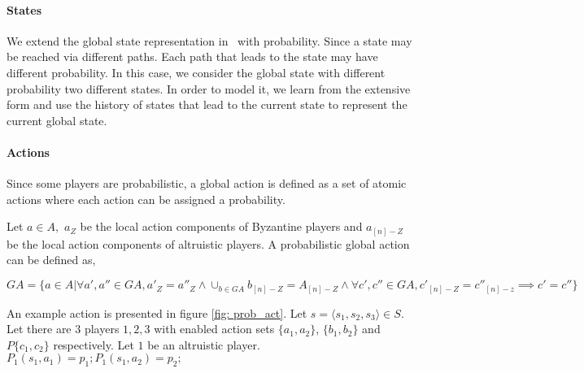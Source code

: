 %
%
%
\paragraph{States}
We extend the global state representation in~\cite{MMS08} with probability. Since a state may be reached via different paths. Each path that leads to the state may have different probability. In this case, we consider the global state with different probability two different states. In order to model it, we learn from the extensive form and use the history of states that lead to the current state to represent the current global state. 


\paragraph{Actions}
Since some players are probabilistic, a global action is defined as a set of atomic actions where each action can be assigned a probability. 

Let $a \in A,$ $a_Z$ be the local action components of Byzantine players and $a_{[n]-Z}$ be the local action components of altruistic players. A probabilistic global action can be defined as, \newline

$ GA=\{ a \in A | \forall a',a'' \in GA, a'_Z = a''_Z  \wedge \cup_{b \in GA} b_{[n]-Z}=A_{[n]-Z} \wedge  \forall c',c'' \in GA, c'_{[n]-Z} = c''_{[n]-z} \implies c'=c'' \}$
  
 
 An example action is presented in figure \ref{fig: prob_act}. Let $s= \langle s_1,s_2,s_3 \rangle \in S$. Let there are $3$ players $1,2,3$ with enabled action sets $\{a_1,a_2\}$, $\{b_1,b_2\}$ and $P\{c_1,c_2\}$ respectively. Let $1$ be an altruistic player. \\
 $P_1(s_1,a_1)=p_1; P_1(s_1,a_2)=p_2;$
 

